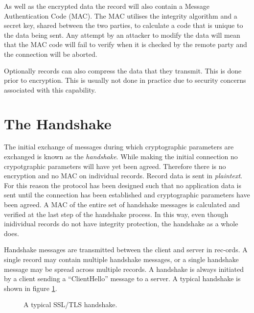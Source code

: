 As well as the encrypted data the record will also contain a Message 
Authentication Code (MAC). The MAC utilises the integrity algorithm and a 
secret key, shared between the two parties, to calculate a code that is unique
to the data being sent. Any attempt by an attacker to modify the data will mean
that the MAC code will fail to verify when it is checked by the remote party 
and the connection will be aborted.

Optionally records can also compress the data that they transmit. This is done 
prior to encryption. This is usually not done in practice due to security 
concerns associated with this capability.

\section{The Handshake}

The initial exchange of messages during which cryptographic parameters are 
exchanged is known as the \emph{handshake}. While making the initial connection
no crypotgraphic parameters will have yet been agreed. Therefore there is no
encryption and no MAC on individual records.  Record data is sent in
\emph{plaintext}. For this reason the protocol has been designed such that no
application data is sent until the connection has been established and
cryptographic parameters have been agreed. A MAC of the entire set of handshake 
messages is calculated and verified at the last step of the handshake process. 
In this way, even though inidividual records do not have integrity protection, 
the handshake as a whole does.

Handshake messages are transmitted between the client and server in rec-ords. A 
single record may contain multiple handshake messages, or a single handshake 
message may be spread across multiple records. A handshake is always initiated 
by a client sending a ``ClientHello'' message to a server. A typical handshake 
is shown in figure \ref{fig:typical-hand}.

\begin{figure}[t]
\caption{A typical SSL/TLS handshake.}
\label{fig:typical-hand}
\end{figure}

